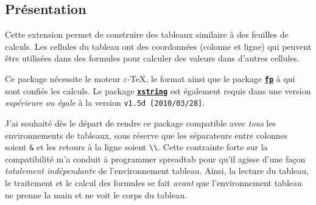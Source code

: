 \documentclass[a4paper,10pt]{article}
\newcommand\ST{\textsf{spreadtab}\xspace}
\begin{document}
\subsection{Présentation}
Cette extension permet de construire des tableaux similaire à des feuilles de calculs. Les cellules du tableau ont des coordonnées (colonne et ligne) qui peuvent être utilisées dans des formules pour calculer des valeurs dans d'autres cellules.

Ce package nécessite le moteur $\varepsilon$-\TeX, le format \LaTeXe{} ainsi que le package \href{http://www.ctan.org/tex-archive/macros/latex/contrib/fp/}{\texttt{\textbf{fp}}} à qui sont confiés les calculs. Le package \href{http://www.ctan.org/tex-archive/macros/latex/contrib/xstring/}{\texttt{\textbf{xstring}}} est également requis dans une version \emph{supérieure ou égale} à la version \verb-v1.5d [2010/03/28]-.

J'ai souhaité dès le départ de rendre ce package compatible avec \emph{tous} les environnements de tableaux, sous réserve que les séparateurs entre colonnes soient \og\verb=&=\fg{} et les retours à la ligne soient \og\verb=\\=\fg{}. Cette contrainte forte sur la compatibilité m'a conduit à programmer \ST pour qu'il agisse d'une façon \emph{totalement indépendante} de l'environnement tableau. Ainsi, la lecture du tableau, le traitement et le calcul des formules se fait \emph{avant} que l'environnement tableau ne prenne la main et ne \og voit\fg{} le corps du tableau.
\end{document}
